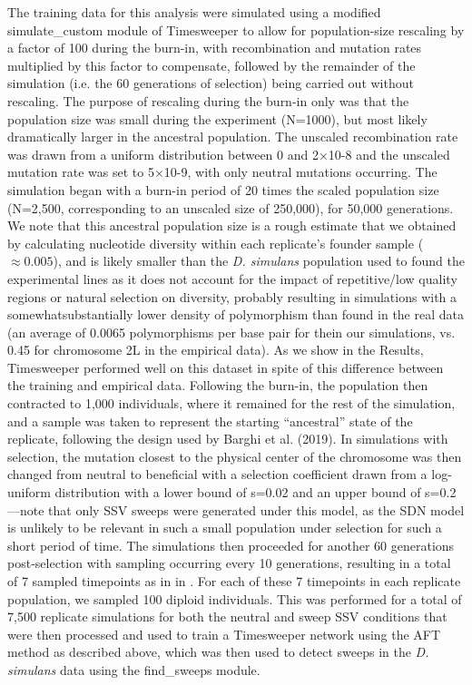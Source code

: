 The training data for this analysis were simulated using a modified simulate\_custom module of Timesweeper to allow for population-size rescaling by a factor of 100 during the burn-in, with recombination and mutation rates multiplied by this factor to compensate, followed by the remainder of the simulation (i.e. the 60 generations of selection) being carried out without rescaling. The purpose of rescaling during the burn-in only was that the population size was small during the experiment (N=1000), but most likely dramatically larger in the ancestral population. The unscaled recombination rate was drawn from a uniform distribution between 0 and 2×10-8 and the unscaled mutation rate was set to 5×10-9, with only neutral mutations occurring. The simulation began with a burn-in period of 20 times the scaled population size (N=2,500, corresponding to an unscaled size of 250,000), for 50,000 generations. We note that this ancestral population size is a rough estimate that we obtained by calculating nucleotide diversity within each replicate’s founder sample ($\approx 0.005$), and is likely smaller than the \textit{D. simulans} population used to found the experimental lines as it does not account for the impact of repetitive/low quality regions or natural selection on diversity, probably resulting in simulations with a somewhatsubstantially lower density of polymorphism than found in the real data (an average of 0.0065 polymorphisms per base pair for thein our simulations, vs. 0.45 for chromosome 2L in the empirical data). As we show in the Results, Timesweeper performed well on this dataset in spite of this difference between the training and empirical data. Following the burn-in, the population then contracted to 1,000 individuals, where it remained for the rest of the simulation, and a sample was taken to represent the starting “ancestral” state of the replicate, following the design used by Barghi et al. (2019). In simulations with selection, the mutation closest to the physical center of the chromosome was then changed from neutral to beneficial with a selection coefficient drawn from a log-uniform distribution with a lower bound of s=0.02 and an upper bound of s=0.2—note that only SSV sweeps were generated under this model, as the SDN model is unlikely to be relevant in such a small population under selection for such a short period of time. The simulations then proceeded for another 60 generations post-selection with sampling occurring every 10 generations, resulting in a total of 7 sampled timepoints as in in \cite{barghiGeneticRedundancyFuels2019}. For each of these 7 timepoints in each replicate population, we sampled 100 diploid individuals. This was performed for a total of 7,500 replicate simulations for both the neutral and sweep SSV conditions that were then processed and used to train a Timesweeper network using the AFT method as described above, which was then used to detect sweeps in the \textit{D. simulans} data using the find\_sweeps module.


